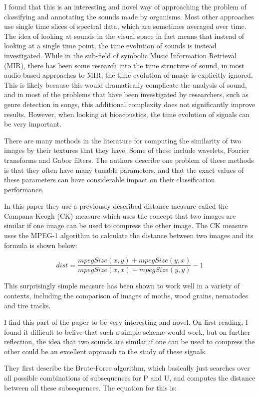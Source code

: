 \documentclass[12pt,oneside]{book}
\begin{document}
I found that this is an interesting and novel way of approaching the
problem of classifying and annotating the sounds made by organisms.
Most other approaches use single time slices of spectral data, which
are sometimes averaged over time.  The idea of looking at sounds in
the visual space in fact means that instead of looking at a single
time point, the time evolution of sounds is instead investigated.
While in the sub-field of symbolic Music Information Retrieval (MIR),
there has been some research into the time structure of sound, in most
audio-based approaches to MIR, the time evolution of music is
explicitly ignored.  This is likely because this would dramatically
complicate the analysis of sound, and in most of the problems that
have been investigated by researchers, such as genre detection in
songs, this additional complexity does not significantly improve
results.  However, when looking at bioacoustics, the time evolution of
signals can be very important.

There are many methods in the literature for computing the similarity
of two images by their textures that they have.  Some of these include
wavelets, Fourier transforms and Gabor filters.  The authors describe
one problem of these methods is that they often have many tunable
parameters, and that the exact values of these parameters can have
considerable impact on their classification performance.

In this paper they use a previously described distance measure called
the Campana-Keogh (CK) measure \cite{campana2010} which uses the
concept that two images are similar if one image can be used to
compress the other image.  The CK measure uses the MPEG-1 algorithm to
calculate the distance between two images and its formula is shown
below:

	\[ dist = \frac{mpegSize(x,y) + mpegSize(y,x)} {mpegSize(x,x) + mpegSize(y,y)} - 1 \]

This surprisingly simple measure has been shown to work well in a
variety of contexts, including the comparison of images of moths, wood
grains, nematodes and tire tracks\cite{campana2010}.

I find this part of the paper to be very interesting and novel.  On
first reading, I found it difficult to belive that such a simple
scheme would work, but on further reflection, the idea that two sounds
are similar if one can be used to compress the other could be an
excellent approach to the study of these signals.

They first describe the Brute-Force algorithm, which basically just
searches over all possible combinations of subsequences for P and U,
and computes the distance between all these subsequences.  The
equation for this is:
\end{document}
